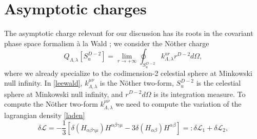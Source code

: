 \documentclass[a4paper,12pt]{article}
\begin{document}
\section{Asymptotic charges}\label{sec3}
The asymptotic charge relevant for our discussion has its roots in the covariant phase space formalism à la Wald \cite{Lee:1990nz,Ciambelli:2022vot}; we consider the N\"other charge
\begin{equation}
    Q_{\Lambda, \lambda}[S^{D-2}_u]=\lim_{r \rightarrow +\infty}\oint_{S^{D-2}_u} k^{ur}_{\Lambda, \lambda}r^{D-2}d\Omega,
    \label{leewald}
\end{equation}
where we already specialize to the codimension-2 celestial sphere at Minkowski null infinity. In \eqref{leewald}, $k^{\mu \nu}_{\Lambda,\lambda}$ is the N\"other two-form, $S_u^{D-2}$ is the celestial sphere at Minkowski null infinity, and $r^{D-2}d\Omega$ is its integration measure. To compute the N\"other two-form $k^{\mu \nu}_{\Lambda,\lambda}$ we need to compute the variation of the lagrangian density \eqref{laden} 
\begin{equation}
    {\displaystyle \delta \mathcal{L}=-{\frac {1}{3}}[\delta(H_{\alpha \beta \gamma \mu })H^{\alpha \beta \gamma \mu }-3\delta(H_{\alpha \beta })H^{\alpha \beta }]}=:\delta \mathcal{L}_1+\delta\mathcal{L}_2,
    \label{ladenvar}
\end{equation}
\end{document}
